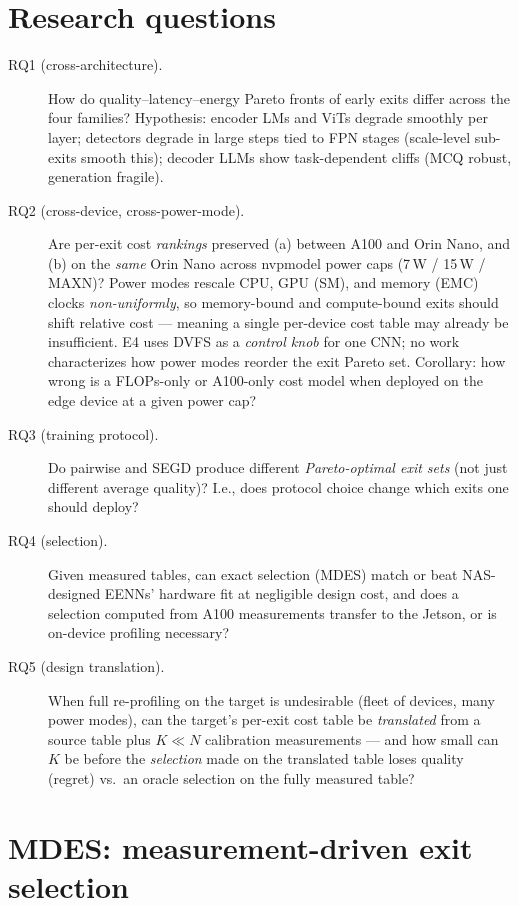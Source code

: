 \documentclass[11pt]{article}
\newcommand{\mdes}{MDES}
\begin{document}
\section{Research questions}

\begin{description}
\item[RQ1 (cross-architecture).] How do quality--latency--energy Pareto fronts
of early exits differ across the four families? Hypothesis: encoder LMs and
ViTs degrade smoothly per layer; detectors degrade in large steps tied to FPN
stages (scale-level sub-exits smooth this); decoder LLMs show
task-dependent cliffs (MCQ robust, generation fragile).
\item[RQ2 (cross-device, cross-power-mode).] Are per-exit cost \emph{rankings}
preserved (a) between A100 and Orin Nano, and (b) on the \emph{same} Orin Nano
across nvpmodel power caps (7\,W / 15\,W / MAXN)? Power modes rescale CPU, GPU
(SM), and memory (EMC) clocks \emph{non-uniformly}, so memory-bound and
compute-bound exits should shift relative cost --- meaning a single per-device
cost table may already be insufficient. E4 \citep{e42025} uses DVFS as a
\emph{control knob} for one CNN; no work characterizes how power modes reorder
the exit Pareto set. Corollary: how wrong is a FLOPs-only or A100-only cost
model when deployed on the edge device at a given power cap?
\item[RQ3 (training protocol).] Do pairwise and SEGD produce different
\emph{Pareto-optimal exit sets} (not just different average quality)? I.e.,
does protocol choice change which exits one should deploy?
\item[RQ4 (selection).] Given measured tables, can exact selection (\mdes{})
match or beat NAS-designed EENNs' hardware fit at negligible design cost, and
does a selection computed from A100 measurements transfer to the Jetson, or is
on-device profiling necessary?
\item[RQ5 (design translation).] When full re-profiling on the target is
undesirable (fleet of devices, many power modes), can the target's per-exit
cost table be \emph{translated} from a source table plus $K \ll N$ calibration
measurements --- and how small can $K$ be before the \emph{selection} made on
the translated table loses quality (regret) vs.\ an oracle selection on the
fully measured table?
\end{description}

\section{\mdes{}: measurement-driven exit selection}
\end{document}
